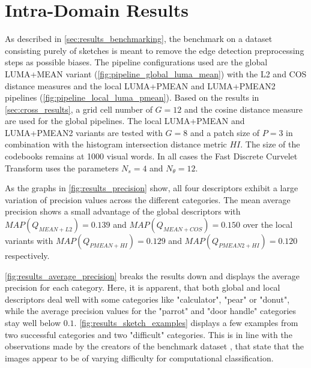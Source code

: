 \section{Intra-Domain Results}\label{sec:intra_results}

As described in \autoref{sec:results_benchmarking}, the benchmark on a dataset
consisting purely of sketches is meant to remove the edge detection
preprocessing steps as possible biases. The pipeline configurations used are
the global LUMA+MEAN variant (\autoref{fig:pipeline_global_luma_mean}) with the
L2 and COS distance measures and the local LUMA+PMEAN and LUMA+PMEAN2
pipelines (\autoref{fig:pipeline_local_luma_pmean}). Based on the results in
\autoref{sec:cross_results}, a grid cell number of $G=12$ and the cosine
distance measure are used for the global pipelines. The local LUMA+PMEAN and
LUMA+PMEAN2 variants are tested with $G=8$ and a patch size of $P=3$ in
combination with the histogram intersection distance metric $HI$. The size of
the codebooks remains at 1000 visual words. In all cases the Fast Discrete
Curvelet Transform uses the parameters $N_s=4$ and $N_{\theta}=12$.

As the graphs in \autoref{fig:results_precision} show, all four descriptors
exhibit a large variation of precision values across the different categories.
The mean average precision shows a small advantage of the global descriptors
with $MAP(Q_{MEAN+L2})=0.139$ and $MAP(Q_{MEAN+COS})=0.150$ over the local
variants with $MAP(Q_{PMEAN+HI})=0.129$ and $MAP(Q_{PMEAN2+HI})=0.120$
respectively.

\autoref{fig:results_average_precision} breaks the results down and displays
the average precision for each category. Here, it is apparent, that both global
and local descriptors deal well with some categories like "calculator", "pear"
or "donut", while the average precision values for the "parrot" and "door
handle" categories stay well below $0.1$. \autoref{fig:results_sketch_examples}
displays a few examples from two successful categories and two "difficult"
categories. This is in line with the observations made by the creators of the
benchmark dataset \autocite{eitz_how_2012}, that state that the images appear
to be of varying difficulty for computational classification. 

